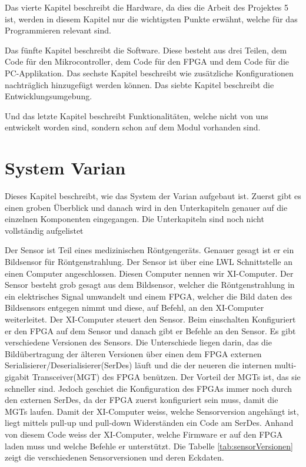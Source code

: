 \documentclass{article}
\begin{document}
Das vierte Kapitel beschreibt die Hardware, da dies die Arbeit des Projektes 5 ist, werden in diesem Kapitel nur die wichtigsten Punkte erwähnt, welche für das Programmieren relevant sind.

Das fünfte Kapitel beschreibt die Software. Diese besteht aus drei Teilen, dem Code für den Mikrocontroller, dem Code für den FPGA und dem Code für die PC-Applikation.
Das sechste Kapitel beschreibt wie zusätzliche Konfigurationen nachträglich hinzugefügt werden können.
Das siebte Kapitel beschreibt die Entwicklungsumgebung.

Und das letzte Kapitel beschreibt Funktionalitäten, welche nicht von uns entwickelt worden sind, sondern schon auf dem Modul vorhanden sind.

\section{System Varian}
Dieses Kapitel beschreibt, wie das System der Varian aufgebaut ist. Zuerst gibt es einen groben Überblick und danach wird in den Unterkapiteln genauer auf die einzelnen Komponenten eingegangen. Die Unterkapiteln sind noch nicht vollständig aufgelistet

Der Sensor ist Teil eines medizinischen Röntgengeräts. Genauer gesagt ist er ein Bildsensor für Röntgenstrahlung. Der Sensor ist über eine LWL Schnittstelle an einen Computer angeschlossen. Diesen Computer nennen wir XI-Computer.  Der Sensor besteht grob gesagt aus dem Bildsensor, welcher die Röntgenstrahlung in ein elektrisches Signal umwandelt und einem FPGA, welcher die Bild daten des Bildsensors entgegen nimmt und diese, auf Befehl, an den XI-Computer weiterleitet. Der XI-Computer steuert den Sensor. Beim einschalten Konfiguriert er den FPGA auf dem Sensor und danach gibt er Befehle an den Sensor. Es gibt verschiedene Versionen des Sensors. Die Unterschiede liegen darin, das die Bildübertragung der älteren Versionen über einen dem FPGA externen Serialisierer/Deserialisierer(SerDes) läuft und die der neueren die internen multi-gigabit Transceiver(MGT) des FPGA benützen. Der Vorteil der MGTs ist, das sie schneller sind. Jedoch geschiet die Konfiguration des FPGAs immer noch durch den externen SerDes, da der FPGA zuerst konfiguriert sein muss, damit die MGTs laufen. Damit der XI-Computer weiss, welche Sensorversion angehängt ist, liegt mittels pull-up und pull-down Widerständen ein Code am SerDes. Anhand von diesem Code weiss der XI-Computer, welche Firmware er auf den FPGA laden muss und welche Befehle er unterstützt.  Die Tabelle \ref{tab:sensorVersionen} zeigt die verschiedenen Sensorversionen und deren Eckdaten.
\end{document}
